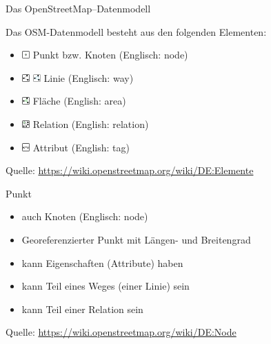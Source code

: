 \documentclass{beamer}
\begin{document}
\begin{frame}[fragile]{Das OpenStreetMap--Datenmodell}

Das OSM-Datenmodell besteht aus den folgenden Elementen:
\begin{itemize}
  \item \includegraphics[height=0.8em]{node}\hspace{0.2em} Punkt bzw. Knoten (Englisch: node) 
  \item \includegraphics[height=0.8em]{way} \hspace{0.2em} \includegraphics[height=0.8em]{closed_way}\hspace{0.2em} Linie (Englisch: way)
  \item \includegraphics[height=0.8em]{area} \hspace{0.2em} Fläche (English: area) 
  \item \includegraphics[height=0.8em]{relation} \hspace{0.2em} Relation (English: relation) 
  \item \includegraphics[height=0.8em]{tag} \hspace{0.2em} Attribut (English: tag) 

\end{itemize}

Quelle: \url{https://wiki.openstreetmap.org/wiki/DE:Elemente}

\end{frame}

\begin{frame}[fragile]{Punkt}

\begin{itemize}
  \item auch Knoten (Englisch: node)
  \item Georeferenzierter Punkt mit Längen- und Breitengrad
  \item kann Eigenschaften (Attribute) haben
  \item kann Teil eines Weges (einer Linie) sein
  \item kann Teil einer Relation sein
\end{itemize}

Quelle: \url{https://wiki.openstreetmap.org/wiki/DE:Node}

\end{frame}
\end{document}
